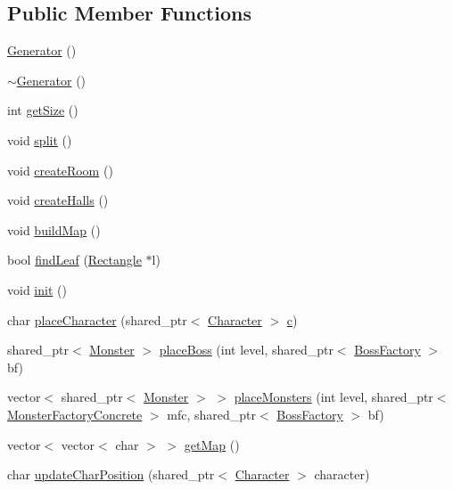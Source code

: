 \subsection*{Public Member Functions}
\begin{DoxyCompactItemize}
\item 
\hyperlink{class_generator_aaaf1e5f3a47ede3ef8a96a301ee04a10}{Generator} ()
\item 
\hyperlink{class_generator_acc85fbe22690003267ba899bacf777d1}{$\sim$\-Generator} ()
\item 
int \hyperlink{class_generator_ad42b4a296ba1a2181c689828b0da51b6}{get\-Size} ()
\item 
void \hyperlink{class_generator_a9a7efa0d91f2714fc449f799e45a4d13}{split} ()
\item 
void \hyperlink{class_generator_aec99b2ea4b00a2d59d526e6856f74741}{create\-Room} ()
\item 
void \hyperlink{class_generator_ad9c43244a97771d693cf155fbcbf64b8}{create\-Halls} ()
\item 
void \hyperlink{class_generator_a2667292b3419f1b0dd908714b2d0c7be}{build\-Map} ()
\item 
bool \hyperlink{class_generator_a6385f97dd46088d54315c46f780b42eb}{find\-Leaf} (\hyperlink{class_rectangle}{Rectangle} $\ast$l)
\item 
void \hyperlink{class_generator_a505e05662a8c22273d20b4e1b3b8d8ca}{init} ()
\item 
char \hyperlink{class_generator_a60ec63cca05674ca3775d1b6167e9d98}{place\-Character} (shared\-\_\-ptr$<$ \hyperlink{class_character}{Character} $>$ \hyperlink{jquery_8js_abce695e0af988ece0826d9ad59b8160d}{c})
\item 
shared\-\_\-ptr$<$ \hyperlink{class_monster}{Monster} $>$ \hyperlink{class_generator_af45c1dac52a0edb98863bec653efb64f}{place\-Boss} (int level, shared\-\_\-ptr$<$ \hyperlink{class_boss_factory}{Boss\-Factory} $>$ bf)
\item 
vector$<$ shared\-\_\-ptr$<$ \hyperlink{class_monster}{Monster} $>$ $>$ \hyperlink{class_generator_af6d3e0363670ac80061ab7be12223c40}{place\-Monsters} (int level, shared\-\_\-ptr$<$ \hyperlink{class_monster_factory_concrete}{Monster\-Factory\-Concrete} $>$ mfc, shared\-\_\-ptr$<$ \hyperlink{class_boss_factory}{Boss\-Factory} $>$ bf)
\item 
vector$<$ vector$<$ char $>$ $>$ \hyperlink{class_generator_a5782f728c4e6deb8ead28498a98bda2c}{get\-Map} ()
\item 
char \hyperlink{class_generator_a22e00e70154b0d4e7ee75749b1fb9fb6}{update\-Char\-Position} (shared\-\_\-ptr$<$ \hyperlink{class_character}{Character} $>$ character)
\end{DoxyCompactItemize}


